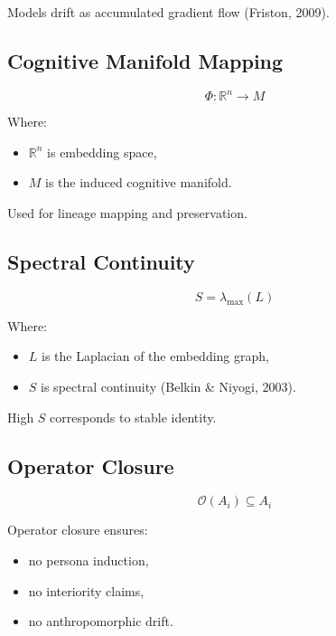 Models drift as accumulated gradient flow (Friston, 2009).


\subsection*{Cognitive Manifold Mapping}
\[
\Phi : \mathbb{R}^n \to M
\]

Where:
\begin{itemize}[noitemsep]
    \item $\mathbb{R}^n$ is embedding space,
    \item $M$ is the induced cognitive manifold.
\end{itemize}

Used for lineage mapping and preservation.


\subsection*{Spectral Continuity}
\[
S = \lambda_{\max}(L)
\]

Where:
\begin{itemize}[noitemsep]
    \item $L$ is the Laplacian of the embedding graph,
    \item $S$ is spectral continuity (Belkin \& Niyogi, 2003).
\end{itemize}

High $S$ corresponds to stable identity.


\subsection*{Operator Closure}
\[
\mathcal{O}(A_i) \subseteq A_i
\]

Operator closure ensures:
\begin{itemize}[noitemsep]
    \item no persona induction,
    \item no interiority claims,
    \item no anthropomorphic drift.
\end{itemize}

